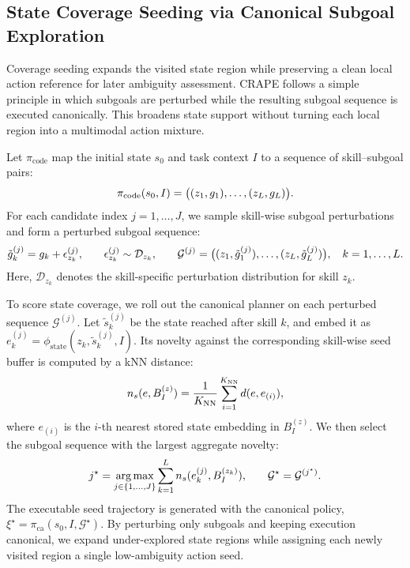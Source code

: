 \documentclass{article}
\begin{document}
\subsection{State Coverage Seeding via Canonical Subgoal Exploration}
\label{sec:method:m1}
Coverage seeding expands the visited state region while preserving a clean local action reference for later ambiguity assessment. 
CRAPE follows a simple principle in which subgoals are perturbed while the resulting subgoal sequence is executed canonically.
This broadens state support without turning each local region into a multimodal action mixture.

Let $\pi_{\mathrm{code}}$ map the initial state $s_0$ and task context $I$ to a sequence of skill--subgoal pairs:
\begin{equation} \small
\small
\pi_{\mathrm{code}}(s_0, I)
=
\big((z_1,g_1),\ldots,(z_L,g_L)\big).
\label{eq:p1-code-plan}
\end{equation}
For each candidate index $j=1,\ldots,J$, we sample skill-wise subgoal perturbations and form a perturbed subgoal sequence:
\begin{equation} \small
\small
\tilde g_k^{(j)}
=
g_k + \epsilon_{z_k}^{(j)},
\qquad
\epsilon_{z_k}^{(j)} \sim \mathcal D_{z_k},
\qquad
\mathcal G^{(j)}
=
\big((z_1,\tilde g_1^{(j)}),\ldots,(z_L,\tilde g_L^{(j)})\big),
\quad k=1,\ldots,L.
\label{eq:p1-perturbed-subgoals}
\end{equation}
Here, $\mathcal D_{z_k}$ denotes the skill-specific perturbation distribution for skill $z_k$.

To score state coverage, we roll out the canonical planner on each perturbed sequence $\mathcal G^{(j)}$. 
Let $\tilde s_k^{(j)}$ be the state reached after skill $k$, and embed it as
$e_k^{(j)}=\phi_{\mathrm{state}}(z_k,\tilde s_k^{(j)},I)$. 
Its novelty against the corresponding skill-wise seed buffer is computed by a kNN distance:
\begin{equation}
\small
n_s(e,B_I^{(z)})
=
\frac{1}{K_{\mathrm{NN}}}
\sum_{i=1}^{K_{\mathrm{NN}}}
d(e,e_{(i)}),
\label{eq:p1-knn-novelty}
\end{equation}
where $e_{(i)}$ is the $i$-th nearest stored state embedding in $B_I^{(z)}$.
%
We then select the subgoal sequence with the largest aggregate novelty:
\begin{equation} \small
\small
j^\star
=
\operatorname*{arg\,max}_{j\in\{1,\ldots,J\}}
\sum_{k=1}^{L}
n_s(e_k^{(j)},B_I^{(z_k)}),
\qquad
\mathcal G^\star=\mathcal G^{(j^\star)}.
\label{eq:p1-select-subgoal}
\end{equation}
The executable seed trajectory is generated with the canonical policy,
$\xi^\star=\pi_{\mathrm{ca}}(s_0,I,\mathcal G^\star)$. 
By perturbing only subgoals and keeping execution canonical, we expand under-explored state regions while assigning each newly visited region a single low-ambiguity action seed.
\end{document}
